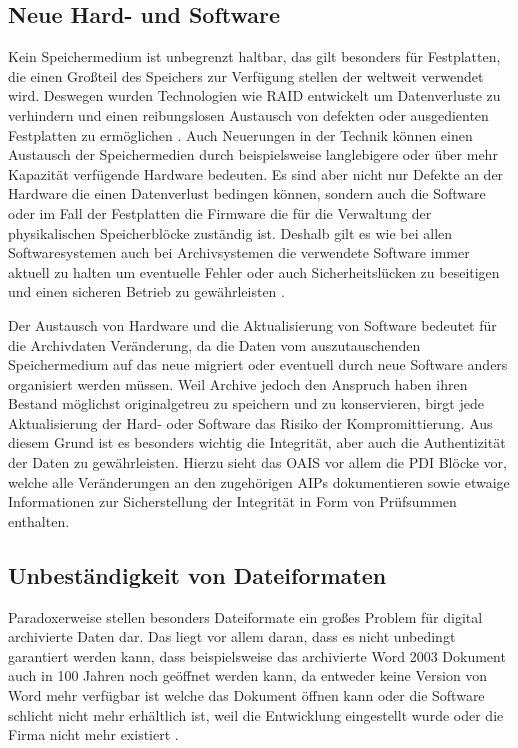 \documentclass[conference,compsoc,final,a4paper]{IEEEtran}
\begin{document}
\subsection{Neue Hard- und Software}
Kein Speichermedium ist unbegrenzt haltbar, das gilt besonders für Festplatten, die einen Großteil des Speichers zur Verfügung stellen der weltweit verwendet wird. Deswegen wurden Technologien wie \ac{RAID} entwickelt um Datenverluste zu verhindern und einen reibungslosen Austausch von defekten oder ausgedienten Festplatten zu ermöglichen \autocite{Lakshmi2008}. Auch Neuerungen in der Technik können einen Austausch der Speichermedien durch beispielsweise langlebigere oder über mehr Kapazität verfügende Hardware bedeuten. Es sind aber nicht nur Defekte an der Hardware die einen Datenverlust bedingen können, sondern auch die Software oder im Fall der Festplatten die Firmware die für die Verwaltung der physikalischen Speicherblöcke zuständig ist. Deshalb gilt es wie bei allen Softwaresystemen auch bei Archivsystemen die verwendete Software immer aktuell zu halten um eventuelle Fehler oder auch Sicherheitslücken zu beseitigen und einen sicheren Betrieb zu gewährleisten \autocite{Lakshmi2008}.

Der Austausch von Hardware und die Aktualisierung von Software bedeutet für die Archivdaten Veränderung, da die Daten vom auszutauschenden Speichermedium auf das neue migriert oder eventuell durch neue Software anders organisiert werden müssen. Weil Archive jedoch den Anspruch haben ihren Bestand möglichst originalgetreu zu speichern und zu konservieren, birgt jede Aktualisierung der Hard- oder Software das Risiko der Kompromittierung. Aus diesem Grund ist es besonders wichtig die Integrität, aber auch die Authentizität der Daten zu gewährleisten. Hierzu sieht das \ac{OAIS} vor allem die \ac{PDI} Blöcke vor, welche alle Veränderungen an den zugehörigen \ac{AIP}s dokumentieren sowie etwaige Informationen zur Sicherstellung der Integrität in Form von Prüfsummen enthalten.

\subsection{Unbeständigkeit von Dateiformaten}
Paradoxerweise stellen besonders Dateiformate ein großes Problem für digital archivierte Daten dar. Das liegt vor allem daran, dass es nicht unbedingt garantiert werden kann, dass beispielsweise das archivierte Word 2003 Dokument auch in 100 Jahren noch geöffnet werden kann, da entweder keine Version von Word mehr verfügbar ist welche das Dokument öffnen kann oder die Software schlicht nicht mehr erhältlich ist, weil die Entwicklung eingestellt wurde oder die Firma nicht mehr existiert \autocite{dpcFormatsStandards}.
\end{document}

